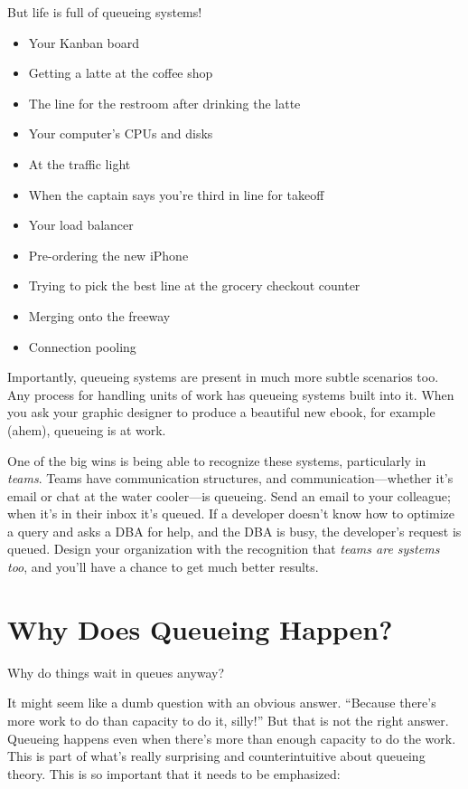 \documentclass{vivid_layout_pdf}
\begin{document}
But life is full of queueing systems!
\begin{itemize}		%
\item Your Kanban board
\item Getting a latte at the coffee shop
\item The line for the restroom after drinking the latte
\item Your computer's CPUs and disks
\item At the traffic light
\item When the captain says you're third in line for takeoff
\item Your load balancer
\item Pre-ordering the new iPhone
\item Trying to pick the best line at the grocery checkout counter
\item Merging onto the freeway
\item Connection pooling
\end{itemize}

Importantly, queueing systems are present in much more subtle scenarios too. Any process for handling units of work has queueing systems built into it. When you ask your graphic designer to produce a beautiful new ebook, for example (ahem), queueing is at work.

One of the big wins is being able to recognize these systems, particularly in {\itshape teams}. Teams have communication structures, and communication---whether it's email or chat at the water cooler---is queueing. Send an email to your colleague; when it's in their inbox it's queued. If a developer doesn't know how to optimize a query and asks a DBA for help, and the DBA is busy, the developer's request is queued. Design your organization with the recognition that {\itshape teams are systems too}, and you'll have a chance to get much better results.

\section{Why Does Queueing Happen?}

Why do things wait in queues anyway?

It might seem like a dumb question with an obvious answer. ``Because there's more work to do than capacity to do it, silly!'' But that is not the right answer. Queueing happens even when there's more than enough capacity to do the work. This is part of what's really surprising and counterintuitive about queueing theory. This is so important that it needs to be emphasized:
\end{document}
